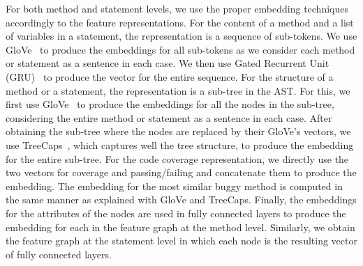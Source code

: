 For both method and statement levels, we use the proper embedding
techniques accordingly to the feature representations. For the content
of a method and a list of variables in a statement, the representation
is a sequence of sub-tokens. We use GloVe~\cite{glove2014} to produce
the embeddings for all sub-tokens as we consider each method or
statement as a sentence in each case. We then use Gated Recurrent Unit
(GRU)~\cite{} to produce the vector for the entire sequence. For the
structure of a method or a statement, the representation is a sub-tree
in the AST. For this, we first use GloVe~\cite{glove2014} to produce
the embeddings for all the nodes in the sub-tree, considering the
entire method or statement as a sentence in each case. After obtaining
the sub-tree where the nodes are replaced by their GloVe's vectors, we
use TreeCaps~\cite{bui2021treecaps}, which captures well the tree
structure, to produce the embedding for the entire sub-tree.  For the
code coverage representation, we directly use the two vectors for
coverage and passing/failing and concatenate them to produce the
embedding. The embedding for the most similar buggy method is computed
in the same manner as explained with GloVe and TreeCaps. Finally, the
embeddings for the attributes of the nodes are used in fully connected
layers to produce the embedding for each in the feature graph at the
method level. Similarly, we obtain the feature graph at the statement
level in which each node is the resulting vector of fully connected
layers.


